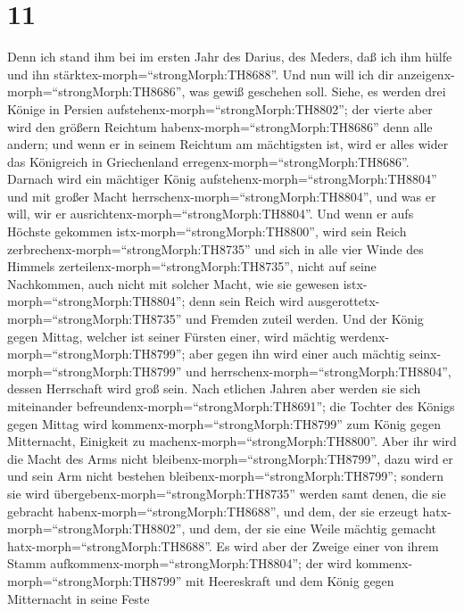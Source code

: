 \hypertarget{section-10}{%
\section{11}\label{section-10}}

 Denn ich stand ihm bei im ersten Jahr des Darius, des
Meders, daß ich ihm hülfe und ihn stärktex-morph=``strongMorph:TH8688''.
 Und nun will ich dir
anzeigenx-morph=``strongMorph:TH8686'', was gewiß geschehen soll. Siehe,
es werden drei Könige in Persien
aufstehenx-morph=``strongMorph:TH8802''; der vierte aber wird den
größern Reichtum habenx-morph=``strongMorph:TH8686'' denn alle andern;
und wenn er in seinem Reichtum am mächtigsten ist, wird er alles wider
das Königreich in Griechenland erregenx-morph=``strongMorph:TH8686''.
 Darnach wird ein mächtiger König
aufstehenx-morph=``strongMorph:TH8804'' und mit großer Macht
herrschenx-morph=``strongMorph:TH8804'', und was er will, wir er
ausrichtenx-morph=``strongMorph:TH8804''.  Und wenn er aufs
Höchste gekommen istx-morph=``strongMorph:TH8800'', wird sein Reich
zerbrechenx-morph=``strongMorph:TH8735'' und sich in alle vier Winde des
Himmels zerteilenx-morph=``strongMorph:TH8735'', nicht auf seine
Nachkommen, auch nicht mit solcher Macht, wie sie gewesen
istx-morph=``strongMorph:TH8804''; denn sein Reich wird
ausgerottetx-morph=``strongMorph:TH8735'' und Fremden zuteil werden.
 Und der König gegen Mittag, welcher ist seiner Fürsten
einer, wird mächtig werdenx-morph=``strongMorph:TH8799''; aber gegen ihn
wird einer auch mächtig seinx-morph=``strongMorph:TH8799'' und
herrschenx-morph=``strongMorph:TH8804'', dessen Herrschaft wird groß
sein.  Nach etlichen Jahren aber werden sie sich miteinander
befreundenx-morph=``strongMorph:TH8691''; die Tochter des Königs gegen
Mittag wird kommenx-morph=``strongMorph:TH8799'' zum König gegen
Mitternacht, Einigkeit zu machenx-morph=``strongMorph:TH8800''. Aber ihr
wird die Macht des Arms nicht bleibenx-morph=``strongMorph:TH8799'',
dazu wird er und sein Arm nicht bestehen
bleibenx-morph=``strongMorph:TH8799''; sondern sie wird
übergebenx-morph=``strongMorph:TH8735'' werden samt denen, die sie
gebracht habenx-morph=``strongMorph:TH8688'', und dem, der sie erzeugt
hatx-morph=``strongMorph:TH8802'', und dem, der sie eine Weile mächtig
gemacht hatx-morph=``strongMorph:TH8688''.  Es wird aber der
Zweige einer von ihrem Stamm aufkommenx-morph=``strongMorph:TH8804'';
der wird kommenx-morph=``strongMorph:TH8799'' mit Heereskraft und dem
König gegen Mitternacht in seine Feste
